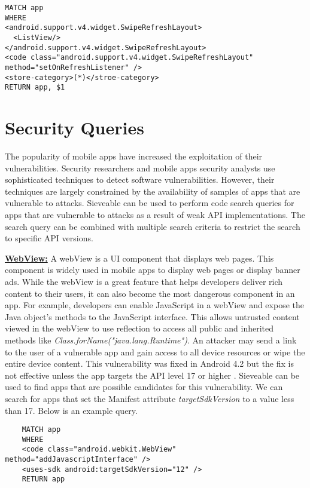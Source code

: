 \begin{verbatim}
MATCH app
WHERE
<android.support.v4.widget.SwipeRefreshLayout>
  <ListView/>
</android.support.v4.widget.SwipeRefreshLayout>
<code class="android.support.v4.widget.SwipeRefreshLayout" method="setOnRefreshListener" />
<store-category>(*)</stroe-category>
RETURN app, $1
\end{verbatim}

\section{Security Queries}
The popularity of mobile apps have increased the exploitation of their vulnerabilities.
Security researchers and mobile apps security analysts use sophisticated techniques to detect software vulnerabilities.
However, their techniques are largely constrained by the availability of samples of apps that are vulnerable to attacks.
Sieveable can be used to perform code search queries for apps that are vulnerable to attacks as a result of weak API implementations.
The search query can be combined with multiple search criteria to restrict the search to specific API versions.

\underline{\textbf{WebView:}}
A webView is a UI component that displays web pages. 
This component is widely used in mobile apps to display web pages or display banner ads.
While the webView is a great feature that helps developers deliver rich content to their users, it can also become the most dangerous component in an app.
For example, developers can enable JavaScript in a webView and expose the Java object's methods to the JavaScript interface.
This allows untrusted  content viewed in the webView to use reflection to access all public and inherited methods like \textit{Class.forName("java.lang.Runtime")}.
An attacker may send a link to the user of a vulnerable app and gain access to all device resources or wipe the entire device content. 
This vulnerability was fixed in Android 4.2 but the fix is not effective unless the app targets the API level 17 or higher \cite{WebViewVulnerability}.
Sieveable can be used to find apps that are possible candidates for this vulnerability.
We can search for apps that set the Manifest attribute \textit{targetSdkVersion} to a value less than 17.  Below is an example query.
\begin{verbatim}
	MATCH app
	WHERE
	<code class="android.webkit.WebView" method="addJavascriptInterface" />
	<uses-sdk android:targetSdkVersion="12" />
	RETURN app
\end{verbatim}

